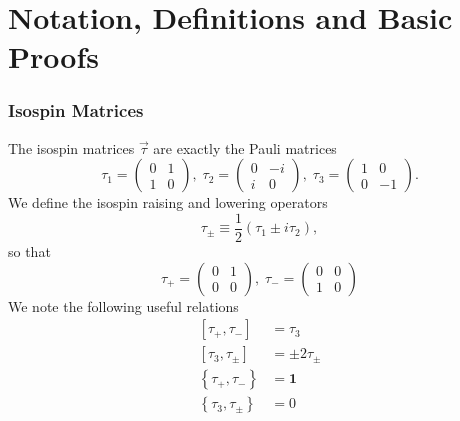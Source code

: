 \documentclass{book}[letterpaper,12pt]
\begin{document}



\appendix
\chapter{Notation, Definitions and Basic Proofs}
\thispagestyle{headings}
\subsection{Isospin Matrices}
The isospin matrices $\vec{\tau}$ are exactly the Pauli matrices
\begin{equation}
\tau_1=\left(\begin{array}{cc}
0 & 1\\
1 & 0
\end{array}\right),\;
\tau_2=\left(\begin{array}{cc}
0 & -i\\
i & 0
\end{array}\right),\;
\tau_3=\left(\begin{array}{cc}
1 & 0\\
0 & -1
\end{array}\right).
\end{equation}
We define the isospin raising and lowering operators
\begin{equation}
\tau_{\pm}\equiv \frac{1}{2}\left(\tau_1\pm i \tau_2\right),
\end{equation}
so that
\begin{equation}
\tau_+=\left(\begin{array}{cc}
0 & 1\\
0 & 0
\end{array}\right),\;\tau_- = \left(\begin{array}{cc}
0 & 0\\
1 & 0
\end{array}\right)
\end{equation}
We note the following useful relations
\begin{equation}
\begin{split}
\left[\tau_+,\tau_-\right]&=\tau_3\\
\left[\tau_3,\tau_{\pm}\right]&=\pm 2\tau_{\pm}\\
\left\{\tau_+,\tau_-\right\}&=\mathbf{1}\\
\left\{\tau_3,\tau_{\pm}\right\}&=0
\end{split}
\end{equation}
\end{document}
